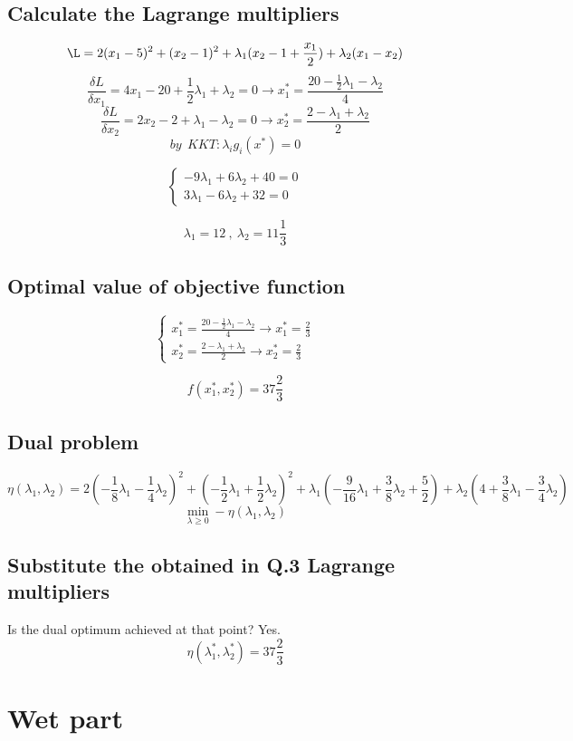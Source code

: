 \documentclass[12pt]{article}
\begin{document}
\subsection{Calculate the Lagrange multipliers}
\[\L=2(x_1-5)^2+(x_2-1)^2 +\lambda_1(x_2-1
+\frac{x_1}{2}) +\lambda_2(x_1-x_2) \]
\[\frac{\delta L}{\delta x_1} = 4 x_1 -20 + \frac{1}{2} \lambda_1 + \lambda_2 = 0 \longrightarrow x_1^* = \frac{20-\frac{1}{2}\lambda_1-\lambda_2}{4} \]
\[\frac{\delta L}{\delta x_2} = 2x_2-2+\lambda_1-\lambda_2=0 \longrightarrow x_2^*=\frac{2-\lambda_1+\lambda_2}{2} \]
\[by \ \ KKT: \lambda_i g_i(x^*)=0 \]

\[
\left\{
\begin{array}{ll}
-9\lambda_1+6\lambda_2+40=0 \\
3\lambda_1-6\lambda_2+32=0
\end{array}
\right.
\]

\[\lambda_1=12 \ , \ \lambda_2=11\frac{1}{3} \]

\subsection{Optimal value of objective function}
\[
\left\{
\begin{array}{ll}
x_1^* = \frac{20-\frac{1}{2}\lambda_1-\lambda_2}{4} \longrightarrow x_1^* = \frac{2}{3}\\
x_2^*=\frac{2-\lambda_1+\lambda_2}{2} \longrightarrow x_2^* = \frac{2}{3}
\end{array}
\right.
\]

\[f(x_1^*,x_2^*)=37 \frac{2}{3} \]

\subsection{Dual problem}
\[\eta(\lambda_1, \lambda_2) = 2(-\frac{1}{8}\lambda_1-\frac{1}{4}\lambda_2)^2 + (-\frac{1}{2}\lambda_1+\frac{1}{2}\lambda_2)^2 + \lambda_1 (-\frac{9}{16}\lambda_1 +\frac{3}{8}\lambda_2+\frac{5}{2})+\lambda_2 (4+\frac{3}{8}\lambda_1-\frac{3}{4}\lambda_2) \]
\[\min_{\lambda \geq 0} -\eta(\lambda_1, \lambda_2) \]

\subsection{Substitute the obtained in Q.3 Lagrange multipliers}
Is the dual optimum achieved at that point? Yes.
\[\eta(\lambda_1^*, \lambda_2^*) = 37 \frac{2}{3} \]

\newpage
\section{Wet part}
\end{document}

